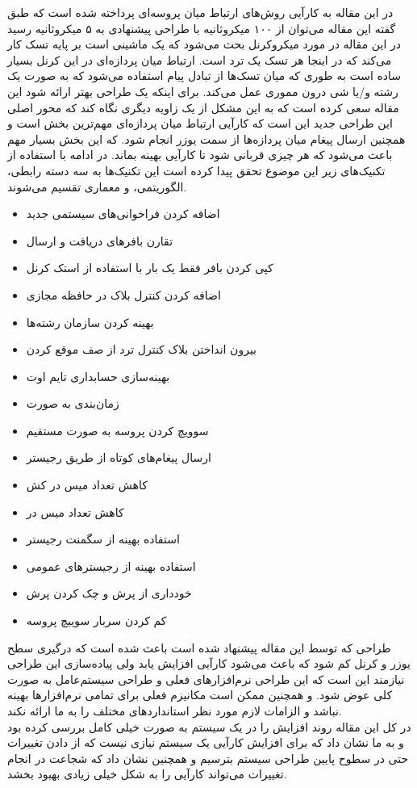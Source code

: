 \documentclass[a4paper, 11pt]{article}
\title{\lr{Improving IPC by Kernel Design}}
\author{حسین افکار}
\begin{document}
\maketitle
در این مقاله به کارآیی روش‌های ارتباط میان پروسه‌ای پرداخته شده است
که طبق گفته این مقاله می‌توان از ۱۰۰ میکرو‌ثانیه با طراحی پیشنهادی به
۵ میکروثانیه رسید \\
در این مقاله در مورد میکروکرنل
بحث می‌شود که یک ماشینی است بر پایه تسک کار می‌کند که در اینجا هر تسک یک
ترد است.
ارتباط میان پردازه‌ای در این کرنل بسیار ساده است به طوری که
میان تسک‌ها از تبادل پیام استفاده می‌شود که به صورت یک رشته
و/یا شی درون مموری عمل می‌کند.
برای اینکه یک طراحی بهتر ارائه شود این مقاله سعی کرده است که به این مشکل از یک زاویه دیگری
نگاه کند
که محور اصلی این طراحی جدید این است که کارآیی ارتباط میان پردازه‌ای مهم‌ترین بخش است
و همچنین ارسال پیغام میان پردازه‌ها از سمت یوزر انجام شود.
که این بخش بسیار مهم باعث می‌شود که هر چیزی قربانی شود تا کارآیی بهینه بماند.
در ادامه با استفاده از تکنیک‌های زیر این موضوع تحقق پیدا کرده است
این تکنیک‌ها به سه دسته رابطی، الگوریتمی، و معماری تقسیم می‌شوند.
\begin{itemize}
    \item اضافه کردن فراخوانی‌های سیستمی جدید
    \item تقارن بافر‌های دریافت و ارسال
    \item کپی کردن بافر فقط یک بار با استفاده از استک کرنل
    \item اضافه کردن کنترل بلاک در حافظه مجازی
    \item بهینه کردن سازمان رشته‌ها
    \item بیرون انداختن بلاک کنترل ترد از صف موقع  کردن
    \item بهینه‌سازی حسابداری تایم اوت
    \item زمان‌بندی به صورت 
    \item سوویچ کردن پروسه به صورت مستقیم
    \item ارسال پیغام‌های کوتاه از طریق رجیستر
    \item کاهش تعداد میس در کش
    \item کاهش تعداد میس در 
    \item استفاده بهینه از سگمنت رجیستر
    \item استفاده بهینه از رجیستر‌های عمومی
    \item خودداری از پرش و چک کردن پرش
    \item کم کردن سربار سوییچ پروسه
\end{itemize}
طراحی که توسط این مقاله پیشنهاد شده است باعث شده است که درگیری سطح یوزر و کرنل
کم شود که باعث می‌شود کارآیی افزایش یابد
ولی پیاده‌سازی این طراحی نیاز‌مند این است که این طراحی نرم‌افزار‌های فعلی
و طراحی سیستم‌عامل به صورت کلی عوض شود.
و همچنین ممکن است مکانیزم فعلی برای تمامی نرم‌افزار‌ها بهینه نباشد و الزامات لازم
مورد نظر استاندارد‌های مختلف را به ما ارائه نکند. \\
در کل این مقاله روند افزایش
را در یک سیستم به صورت خیلی کامل بررسی کرده بود و به ما نشان داد که برای افزایش
کارآیی یک سیستم نیازی نیست که از دادن تغییرات حتی در
سطوح پایین طراحی سیستم بترسیم و همچنین نشان داد که شجاعت در انجام تغییرات می‌تواند
کارآیی را به شکل خیلی زیادی بهبود بخشد.
\end{document}
